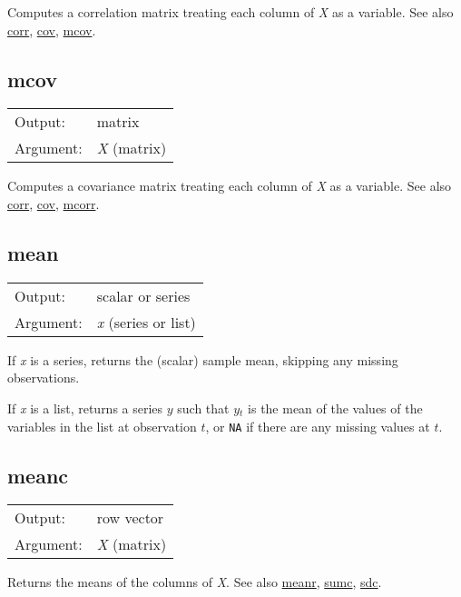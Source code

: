 	  Computes a correlation matrix treating each column of
	  \textsl{X} as a variable. 
	  See also \hyperlink{func-corr}{corr}, \hyperlink{func-cov}{cov}, \hyperlink{func-mcov}{mcov}.

\subsection{mcov}
\hypertarget{func-mcov}{}

\begin{tabular}{ll}
Output:     & matrix\\
Argument:   & \textsl{X} (matrix)\\
\end{tabular}

	  Computes a covariance matrix treating each column of
	  \textsl{X} as a variable. 
	  See also \hyperlink{func-corr}{corr}, \hyperlink{func-cov}{cov}, \hyperlink{func-mcorr}{mcorr}.

\subsection{mean}
\hypertarget{func-mean}{}

\begin{tabular}{ll}
Output:     & scalar or series\\
Argument:   & \textsl{x} (series or list)\\
\end{tabular}

	  If \textsl{x} is a series, returns the (scalar) sample
	  mean, skipping any missing observations.

	  If \textsl{x} is a list, returns a series \ensuremath{y}
	  such that \ensuremath{y}\ensuremath{_{t}} is the mean of the values of
	  the variables in the list at observation \ensuremath{t}, or
	  \texttt{NA} if there are any missing values at \ensuremath{t}.

\subsection{meanc}
\hypertarget{func-meanc}{}

\begin{tabular}{ll}
Output:     & row vector\\
Argument:   & \textsl{X} (matrix)\\
\end{tabular}

	  Returns the means of the columns of \textsl{X}. 
	  See also \hyperlink{func-meanr}{meanr}, \hyperlink{func-sumc}{sumc}, \hyperlink{func-sdc}{sdc}.

